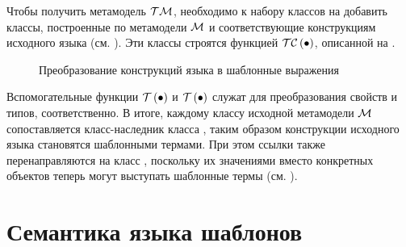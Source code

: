 Чтобы получить метамодель $\mathcal{TM}$, необходимо к набору классов на  добавить классы, построенные по метамодели $\mathcal{M}$ и соответствующие конструкциям исходного языка (см. ). Эти классы строятся функцией $\mathcal{TC}\left(\bullet\right)$, описанной на .
%
\begin{figure}[htbp]
	\centering
{}
	\caption{Преобразование конструкций языка в шаблонные выражения}\label{TC}
\end{figure}

Вспомогательные функции $\mathcal{T}\left(\bullet\right)$ и $\mathcal{T}\left(\bullet\right)$ служат для преобразования свойств и типов, соответственно. В итоге, каждому классу исходной метамодели $\mathcal{M}$ сопоставляется класс-наследник класса , таким образом конструкции исходного языка становятся шаблонными термами. При этом ссылки также перенаправляются на класс , поскольку их значениями вместо конкретных объектов теперь могут выступать шаблонные термы (см. ).

\section{Семантика языка шаблонов}

